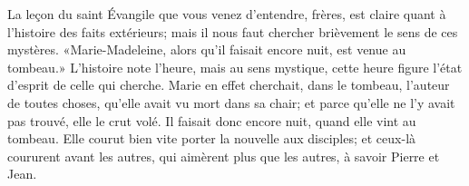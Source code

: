 La leçon du saint Évangile que vous venez d’entendre, frères,
	est claire quant à l’histoire des faits extérieurs;
	mais il nous faut chercher brièvement le sens de ces mystères.
«Marie-Madeleine, alors qu’il faisait encore nuit, est venue au tombeau.»
L’histoire note l’heure,
	mais au sens mystique,
		cette heure figure l’état d’esprit de celle qui cherche.
Marie en effet cherchait, dans le tombeau,
	l’auteur de toutes choses, qu’elle avait vu mort dans sa chair;
	et parce qu’elle ne l’y avait pas trouvé, elle le crut volé.
Il faisait donc encore nuit, quand elle vint au tombeau.
Elle courut bien vite porter la nouvelle aux disciples;
	et ceux-là coururent avant les autres,
	qui aimèrent plus que les autres,
	à savoir Pierre et Jean.
